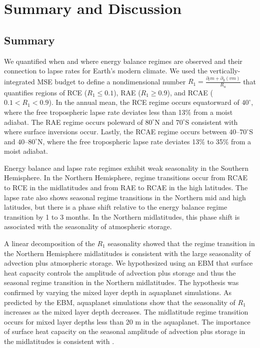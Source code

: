 \documentclass{ametsocV5}
\begin{document}
\section{Summary and Discussion}\label{sec:conclusion}
\subsection{Summary}
We quantified when and where energy balance regimes are observed and their connection to lapse rates for Earth's modern climate. We used the vertically-integrated MSE budget to define a nondimensional number $R_1=\frac{\partial_t m + \partial_y (vm)}{R_a}$ that quantifies regions of RCE ($R_1\le0.1$), RAE ($R_1\ge0.9$), and RCAE ($0.1<R_1<0.9$). In the annual mean, the RCE regime occurs equatorward of $40^\circ$, where the free tropospheric lapse rate deviates less than 13\% from a moist adiabat. The RAE regime occurs poleward of $80^\circ$N and $70^\circ$S consistent with where surface inversions occur. Lastly, the RCAE regime occurs between $40$--$70^\circ$S and $40$--$80^\circ$N, where the free tropospheric lapse rate deviates 13\% to 35\% from a moist adiabat.

Energy balance and lapse rate regimes exhibit weak seasonality in the Southern Hemisphere. In the Northern Hemisphere, regime transitions occur from RCAE to RCE in the midlatitudes and from RAE to RCAE in the high latitudes. The lapse rate also shows seasonal regime transitions in the Northern mid and high latitudes, but there is a phase shift relative to the energy balance regime transition by 1 to 3 months. In the Northern midlatitudes, this phase shift is associated with the seasonality of atmospheric storage.

A linear decomposition of the $R_1$ seasonality showed that the regime transition in the Northern Hemisphere midlatitudes is consistent with the large seasonality of advection plus atmospheric storage. We hypothesized using an EBM that surface heat capacity controls the amplitude of advection plus storage and thus the seasonal regime transition in the Northern midlatitudes. The hypothesis was confirmed by varying the mixed layer depth in aquaplanet simulations. As predicted by the EBM, aquaplanet simulations show that the seasonality of $R_1$ increases as the mixed layer depth decreases. The midlatitude regime transition occurs for mixed layer depths less than 20 m in the aquaplanet. The importance of surface heat capacity on the seasonal amplitude of advection plus storage in the midlatitudes is consistent with \cite{barpanda2020}.
\end{document}

